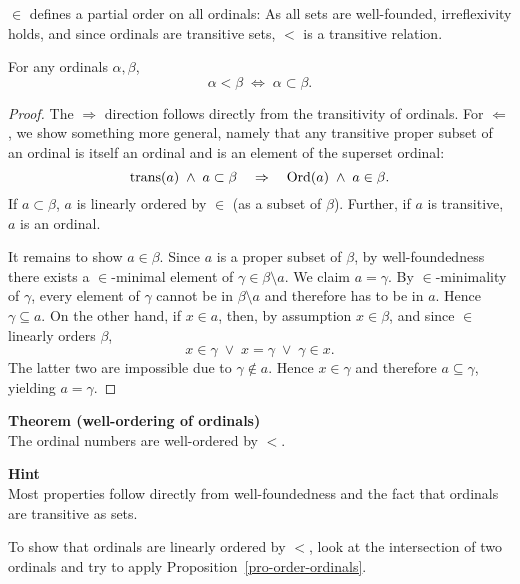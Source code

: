 $\in$ defines a partial order on all ordinals:
As all sets are well-founded, irreflexivity holds, and since ordinals are transitive sets, $<$ is a transitive relation.

\begin{proposition}\label{pro-order-ordinals}For any ordinals $\alpha, \beta$,
\begin{equation}

\alpha < \beta \; \iff \; \alpha \subset \beta.
\end{equation}

\end{proposition}\begin{proof}The $\Rightarrow$ direction follows directly from the transitivity of ordinals.
For $\Leftarrow$, we show something more general, namely that any transitive proper subset of an ordinal is itself an ordinal and is an element of the superset ordinal:
\begin{equation}

\Op{trans}(a) \; \wedge \; a \subset \beta \quad \Rightarrow \quad \Op{Ord}(a) \; \wedge \; a \in \beta.
\end{equation}
If $a \subset \beta$, $a$ is linearly ordered by $\in$ (as a subset of $\beta$). Further, if $a$ is transitive, $a$ is an ordinal.

It remains to show $a \in \beta$. Since $a$ is a proper subset of $\beta$, by well-foundedness there exists a $\in$-minimal element of $\gamma \in \beta \setminus a$. We claim $a = \gamma$. By $\in$-minimality of $\gamma$, every element of $\gamma$ cannot be in $\beta\setminus a$ and therefore has to be in $a$. Hence $\gamma \subseteq a$. On the other hand, if $x \in a$, then, by assumption $x \in \beta$, and since $\in$ linearly orders $\beta$,
\begin{equation}

x \in \gamma \; \vee \; x = \gamma \; \vee \; \gamma \in x.
\end{equation}
The latter two are impossible due to $\gamma \notin a$. Hence $x \in \gamma$ and therefore $a \subseteq \gamma$, yielding $a =\gamma$.

\end{proof}\begin{framed}
\textbf{Theorem (well-ordering of ordinals)}\\
The ordinal numbers are well-ordered by $<$.
\end{framed}

\begin{framed}
\textbf{Hint}\\
Most properties follow directly from well-foundedness and the fact that ordinals are transitive as sets.

To show that ordinals are linearly ordered by $<$, look at the intersection of two ordinals and try to apply Proposition~\ref{pro-order-ordinals}.
\end{framed}

